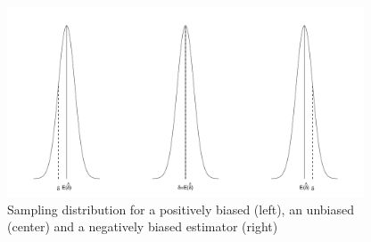 \documentclass[
  english,
  man,floatsintext]{apa6}
\begin{document}
\begin{figure}
\includegraphics[width=400px]{ES_files/figure-latex/BIAS-1} \caption{Sampling distribution for a positively biased (left), an unbiased (center) and a negatively biased estimator (right)}\label{fig:BIAS}
\end{figure}
\end{document}
